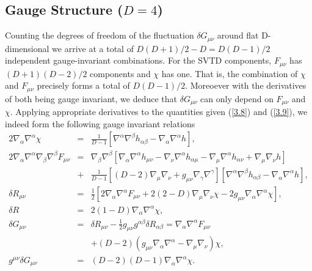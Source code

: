 \subsection{Gauge Structure ($D=4$)}
\label{S1e}
%
Counting the degrees of freedom of the fluctuation $\delta G_{\mu\nu}$ around flat D-dimensional we arrive at a total of $D(D+1)/2-D=D(D-1)/2$ independent gauge-invariant combinations. For the SVTD components, $F_{\mu\nu}$ has $(D+1)(D-2)/2$ components and $\chi$ has one. That is, the combination of $\chi$ and $F_{\mu\nu}$ precisely forms a total of $D(D-1)/2$. Moreoever with the derivatives of both being gauge invariant, we deduce that $\delta G_{\mu\nu}$ can only depend on $F_{\mu\nu}$ and $\chi$. Applying appropriate derivatives to the quantities given (\ref{3.8}) and (\ref{3.9}), we indeed form the following gauge invariant relations
%
\begin{eqnarray}
2\nabla_{\alpha}\nabla^{\alpha}\chi&=&\frac{1}{D-1}\left[\nabla^{\alpha}\nabla^{\beta}h_{\alpha\beta}-\nabla_{\alpha}\nabla^{\alpha}h\right],
\nonumber\\
2\nabla_{\alpha}\nabla^{\alpha}\nabla_{\beta}\nabla^{\beta}F_{\mu\nu}&=&\nabla_{\beta}\nabla^{\beta}\left[\nabla_{\alpha}\nabla^{\alpha}h_{\mu\nu}-\nabla_{\nu}\nabla^{\alpha}h_{\alpha\mu}-\nabla_{\mu}\nabla^{\alpha}h_{\alpha\nu}+\nabla_{\mu}\nabla_{\nu}h\right]
\nonumber\\
&+&\frac{1}{D-1}\left[(D-2)\nabla_{\mu}\nabla_{\nu}+g_{\mu\nu}\nabla_{\gamma}\nabla^{\gamma}\right][\nabla^{\alpha}\nabla^{\beta}h_{\alpha\beta}-\nabla_{\alpha}\nabla^{\alpha}h],
\nonumber\\
\delta R_{\mu\nu}&=&\frac{1}{2}[2\nabla_{\alpha}\nabla^{\alpha}F_{\mu\nu}+2(2-D)\nabla_{\mu}\nabla_{\nu}\chi-2g_{\mu\nu}\nabla_{\alpha}\nabla^{\alpha}\chi],
\nonumber\\
\delta R&=&2(1-D)\nabla_{\alpha}\nabla^{\alpha}\chi,
\nonumber\\
\delta G_{\mu\nu}&=&\delta R_{\mu\nu}-\frac{1}{2}g_{\mu\nu}g^{\alpha\beta}\delta R_{\alpha\beta}=\nabla_{\alpha}\nabla^{\alpha}F_{\mu\nu}
\nonumber\\
&&+(D-2)(g_{\mu\nu}\nabla_{\alpha}\nabla^{\alpha}-\nabla_{\mu}\nabla_{\nu})\chi,
\nonumber\\
g^{\mu\nu}\delta G_{\mu\nu}&=&(D-2)(D-1)\nabla_{\alpha}\nabla^{\alpha}\chi.
\label{3.10}
\end{eqnarray}
%
